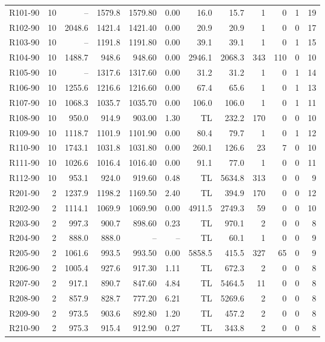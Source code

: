 \documentclass[10pt]{article}
\begin{document}
\begin{table}[p]
\begin{tabular}{lrrrrrrrrrrr}
\midrule
R101-90 & 10 & -- & 1579.8 & 1579.80 & 0.00 & 16.0 & 15.7 & 1 & 0 & 1 & 19 \\
R102-90 & 10 & 2048.6 & 1421.4 & 1421.40 & 0.00 & 20.9 & 20.9 & 1 & 0 & 0 & 17 \\
R103-90 & 10 & -- & 1191.8 & 1191.80 & 0.00 & 39.1 & 39.1 & 1 & 0 & 1 & 15 \\
R104-90 & 10 & 1488.7 & 948.6 & 948.60 & 0.00 & 2946.1 & 2068.3 & 343 & 110 & 0 & 10 \\
R105-90 & 10 & -- & 1317.6 & 1317.60 & 0.00 & 31.2 & 31.2 & 1 & 0 & 1 & 14 \\
R106-90 & 10 & 1255.6 & 1216.6 & 1216.60 & 0.00 & 67.4 & 65.6 & 1 & 0 & 1 & 13 \\
R107-90 & 10 & 1068.3 & 1035.7 & 1035.70 & 0.00 & 106.0 & 106.0 & 1 & 0 & 1 & 11 \\
R108-90 & 10 & 950.0 & 914.9 & 903.00 & 1.30 & TL & 232.2 & 170 & 0 & 0 & 10 \\
R109-90 & 10 & 1118.7 & 1101.9 & 1101.90 & 0.00 & 80.4 & 79.7 & 1 & 0 & 1 & 12 \\
R110-90 & 10 & 1743.1 & 1031.8 & 1031.80 & 0.00 & 260.1 & 126.6 & 23 & 7 & 0 & 10 \\
R111-90 & 10 & 1026.6 & 1016.4 & 1016.40 & 0.00 & 91.1 & 77.0 & 1 & 0 & 0 & 11 \\
R112-90 & 10 & 953.1 & 924.0 & 919.60 & 0.48 & TL & 5634.8 & 313 & 0 & 0 & 9 \\
\midrule
R201-90 & 2 & 1237.9 & 1198.2 & 1169.50 & 2.40 & TL & 394.9 & 170 & 0 & 0 & 12 \\
R202-90 & 2 & 1114.1 & 1069.9 & 1069.90 & 0.00 & 4911.5 & 2749.3 & 59 & 0 & 0 & 10 \\
R203-90 & 2 & 997.3 & 900.7 & 898.60 & 0.23 & TL & 970.1 & 2 & 0 & 0 & 8 \\
R204-90 & 2 & 888.0 & 888.0 & -- & -- & TL & 60.1 & 1 & 0 & 0 & 9 \\
R205-90 & 2 & 1061.6 & 993.5 & 993.50 & 0.00 & 5858.5 & 415.5 & 327 & 65 & 0 & 9 \\
R206-90 & 2 & 1005.4 & 927.6 & 917.30 & 1.11 & TL & 672.3 & 2 & 0 & 0 & 8 \\
R207-90 & 2 & 917.1 & 890.7 & 847.60 & 4.84 & TL & 5464.5 & 11 & 0 & 0 & 8 \\
R208-90 & 2 & 857.9 & 828.7 & 777.20 & 6.21 & TL & 5269.6 & 2 & 0 & 0 & 8 \\
R209-90 & 2 & 973.5 & 903.6 & 892.80 & 1.20 & TL & 457.2 & 2 & 0 & 0 & 8 \\
R210-90 & 2 & 975.3 & 915.4 & 912.90 & 0.27 & TL & 343.8 & 2 & 0 & 0 & 8 \\

\end{tabular}
\end{table}
\end{document}
